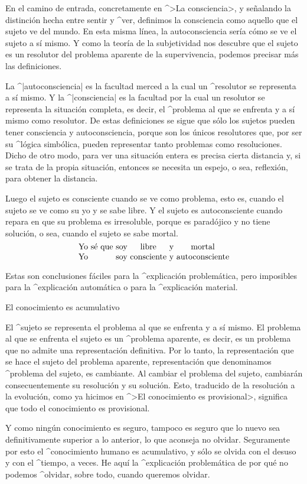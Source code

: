 En el camino de entrada, concretamente en ^>La consciencia>, y señalando
la distinción hecha entre sentir y ^{ver}, definimos la consciencia como
aquello que el sujeto ve del mundo. En esta misma línea, la
autoconsciencia sería cómo se ve el sujeto a sí mismo. Y como la teoría
de la subjetividad nos descubre que el sujeto es un resolutor del
problema aparente de la supervivencia, podemos precisar más las
definiciones.

La ^|autoconsciencia| es la facultad merced a la cual un ^{resolutor} se
representa a sí mismo. Y la ^|consciencia| es la facultad por la cual un
resolutor se representa la situación completa, es decir, el ^{problema}
al que se enfrenta y a sí mismo como resolutor. De estas definiciones se
sigue que sólo los sujetos pueden tener consciencia y autoconsciencia,
porque son los únicos resolutores que, por ser su ^{lógica simbólica},
pueden representar tanto problemas como resoluciones. Dicho de otro
modo, para ver una situación entera es precisa cierta distancia y, si se
trata de la propia situación, entonces se necesita un espejo, o sea,
reflexión, para obtener la distancia.


Luego el sujeto es consciente cuando se ve como problema, esto es,
cuando el sujeto se ve como su yo y se sabe libre. Y el sujeto es
autoconsciente cuando repara en que su problema es irresoluble, porque
es paradójico y no tiene solución, o sea, cuando el sujeto se sabe
mortal.
$$\vbox{\halign{&\hfil#\hfil\cr
  Yo &sé que &soy &libre &y & mortal\cr
  Yo &&soy &consciente &y & autoconsciente\cr}}$$

Estas son conclusiones fáciles para la ^{explicación problemática}, pero
imposibles para la ^{explicación automática} o para la ^{explicación
material}.


\Section El conocimiento es acumulativo

El ^{sujeto} se representa el problema al que se enfrenta y a sí mismo.
El problema al que se enfrenta el sujeto es un ^{problema aparente}, es
decir, es un problema que no admite una representación definitiva. Por
lo tanto, la representación que se hace el sujeto del problema aparente,
representación que denominamos ^{problema del sujeto}, es cambiante. Al
cambiar el problema del sujeto, cambiarán consecuentemente su resolución
y su solución. Esto, traducido de la resolución a la evolución, como ya
hicimos en ^>El conocimiento es provisional>, significa que todo el
conocimiento es provisional.

Y como ningún conocimiento es seguro, tampoco es seguro que lo nuevo sea
definitivamente superior a lo anterior, lo que aconseja no olvidar.
Seguramente por esto el ^{conocimiento} humano es acumulativo, y sólo se
olvida con el desuso y con el ^{tiempo}, a veces. He aquí la
^{explicación problemática} de por qué no podemos ^{olvidar}, sobre
todo, cuando queremos olvidar.


